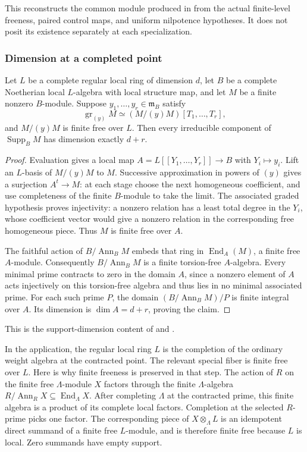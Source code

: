 This reconstructs the common module produced in
 from the actual finite-level
freeness, paired control maps, and uniform nilpotence hypotheses.
It does not posit its existence separately at each specialization.

\subsubsection{Dimension at a completed point}
\begin{srlemma}\label{lem:sr-patched-support-dimension}
Let $L$ be a complete regular local ring of dimension $d$, let $B$ be
a complete Noetherian local $L$-algebra with local structure map,
and let $M$ be a finite nonzero $B$-module.
Suppose $y_1,\ldots,y_r\in\mathfrak m_B$ satisfy
\[
 \operatorname{gr}_{(y)}M
                  \simeq(M/(y)M)[T_1,\ldots,T_r],
\]
and $M/(y)M$ is finite free over $L$.
Then every irreducible component of $\operatorname{Supp}_BM$ has
dimension exactly $d+r$.
\end{srlemma}
\begin{proof}
Evaluation gives a local map $A=L[[Y_1,\ldots,Y_r]]\to B$ with
$Y_i\mapsto y_i$.
Lift an $L$-basis of $M/(y)M$ to $M$.
Successive approximation in powers of $(y)$ gives a surjection
$A^t\to M$: at each stage choose the next homogeneous coefficient,
and use completeness of the finite $B$-module to take the limit.
The associated graded hypothesis proves injectivity:
a nonzero relation has a least total degree in the $Y_i$, whose
coefficient vector would give a nonzero relation in the corresponding
free homogeneous piece.
Thus $M$ is finite free over $A$.

The faithful action of $B/\operatorname{Ann}_BM$ embeds that ring in
$\operatorname{End}_A(M)$, a finite free $A$-module.
Consequently $B/\operatorname{Ann}_BM$ is a finite torsion-free
$A$-algebra.
Every minimal prime contracts to zero in the domain $A$, since a
nonzero element of $A$ acts injectively on this torsion-free algebra
and thus lies in no minimal associated prime.
For each such prime $P$, the domain
$(B/\operatorname{Ann}_BM)/P$ is finite integral over $A$.
Its dimension is $\dim A=d+r$, proving the claim.
\end{proof}
This is the support-dimension content of
and .

In the application, the regular local ring $L$ is the completion of
the ordinary weight algebra at the contracted point.
The relevant special fiber is finite free over $L$.
Here is why finite freeness is preserved in that step.
The action of $R$ on the finite free $\Lambda$-module $X$ factors
through the finite $\Lambda$-algebra
$R/\operatorname{Ann}_RX\subseteq\operatorname{End}_\Lambda X$.
After completing $\Lambda$ at the contracted prime, this finite algebra
is a product of its complete local factors.
Completion at the selected $R$-prime picks one factor.
The corresponding piece of $X\otimes_\Lambda L$ is an idempotent
direct summand of a finite free $L$-module, and is therefore finite
free because $L$ is local. Zero summands have empty support.

